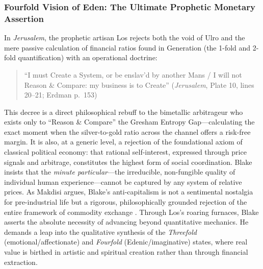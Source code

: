\documentclass[
]{article}
\begin{document}
\subsubsection{Fourfold Vision of Eden: The Ultimate Prophetic Monetary
Assertion}\label{fourfold-vision-of-eden-the-ultimate-prophetic-monetary-assertion}

In \emph{Jerusalem}, the prophetic artisan Los rejects both the void of
Ulro and the mere passive calculation of financial ratios found in
Generation (the 1-fold and 2-fold quantification) with an operational
doctrine:

\begin{quote}
``I must Create a System, or be enslav'd by another Mans / I will not
Reason \& Compare: my business is to Create'' (\emph{Jerusalem}, Plate
10, lines 20--21; Erdman p.~153) \citep{erdman1988complete}
\end{quote}

This decree is a direct philosophical rebuff to the bimetallic
arbitrageur who exists only to ``Reason \& Compare'' the Gresham Entropy
Gap---calculating the exact moment when the silver-to-gold ratio across
the channel offers a risk-free margin. It is also, at a generic level, a
rejection of the foundational axiom of classical political economy: that
rational self-interest, expressed through price signals and arbitrage,
constitutes the highest form of social coordination. Blake insists that
the \emph{minute particular}---the irreducible, non-fungible quality of
individual human experience---cannot be captured by any system of
relative prices. As Makdisi argues, Blake's anti-capitalism is not a
sentimental nostalgia for pre-industrial life but a rigorous,
philosophically grounded rejection of the entire framework of commodity
exchange \citep{makdisi2003william}. Through Los's roaring furnaces,
Blake asserts the absolute necessity of advancing beyond quantitative
mechanics. He demands a leap into the qualitative synthesis of the
\emph{Threefold} (emotional/affectionate) and \emph{Fourfold}
(Edenic/imaginative) states, where real value is birthed in artistic and
spiritual creation rather than through financial extraction.
\end{document}

